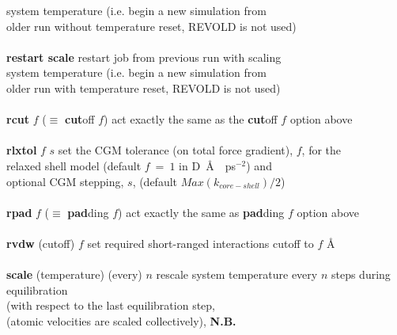 \begin{tabbing}
\>                                              \> system temperature (i.e. begin a new simulation from \\
\>                                              \> older run without temperature reset, REVOLD is not used) \\
\>                                              \> \\
\> {\bf restart scale}                          \> restart job from previous run with scaling \\
\>                                              \> system temperature (i.e. begin a new simulation from \\
\>                                              \> older run with temperature reset, REVOLD is not used) \\
\>                                              \> \\
\> {\bf rcut} $f$  ($\equiv$ {\bf cut}off $f$)  \> act exactly the same as the {\bf cut}off $f$ option above \\
\>                                              \> \\
\> {\bf rlxtol} $f$ $s$                         \> set the CGM tolerance (on total force gradient), $f$, for the \\
\>                                              \> relaxed shell model (default $f~=~1$ in D~\AA~~ps$^{-2}$) and \\
\>                                              \> optional CGM stepping, $s$, (default $Max(k_{core-shell})/2$) \\
\>                                              \> \\
\> {\bf rpad} $f$  ($\equiv$ {\bf pad}ding $f$) \> act exactly the same as {\bf pad}ding $f$ option above \\
\>                                              \> \\
\> {\bf rvdw} (cutoff) $f$                      \> set required short-ranged interactions cutoff to $f$ \AA \\
\>                                              \> \\
\> {\bf scale} (temperature) (every) $n$        \> rescale system temperature every $n$ steps during equilibration \\
\>                                              \> (with respect to the last equilibration step, \\
\>                                              \> (atomic velocities are scaled collectively), {\bf N.B.} \\

\end{tabbing}
